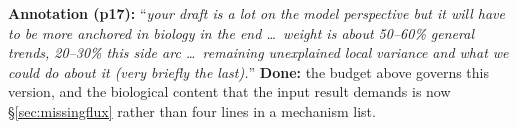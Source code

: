 \documentclass[11pt]{article}
\begin{document}
\begin{ann}
\textbf{Annotation (p17):} ``\emph{your draft is a lot on the model perspective but it will have to be
more anchored in biology in the end \dots\ weight is about 50--60\% general trends, 20--30\% this side
arc \dots\ remaining unexplained local variance and what we could do about it (very briefly the
last).}'' \textbf{Done:} the budget above governs this version, and the biological content that the
input result demands is now \S\ref{sec:missingflux} rather than four lines in a mechanism list.
\end{ann}

\end{document}
